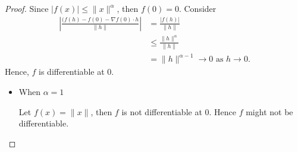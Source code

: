 \begin{Exercise}
\begin{proof}
Since $|f(x)| \leq \|x\|^{\alpha}$, then $f(0) = 0$.
Consider
\begin{align*}
\left| \frac{(f(h)-f(0)-\nabla f(0)\cdot h}{\| h \|} \right|
&= \frac{|f(h)|}{\| h \|} \\
&\leq \frac{\| h \|^{\alpha}}{\| h \|} \\
&= \| h \|^{\alpha-1} \to 0 \text{ as } h\to 0.
\end{align*}
Hence, $f$ is differentiable at $0$.

\begin{itemize}
\item When $\alpha = 1$

Let $f(x) = \| x \|$, then $f$ is not differentiable at $0$. Hence $f$ might not be differentiable.
\end{itemize}


\end{proof}
\end{Exercise}